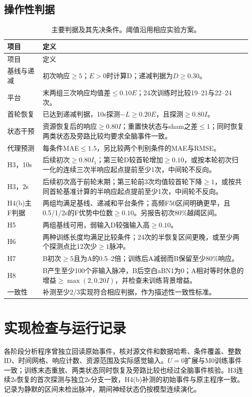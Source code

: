 \subsection{操作性判据}
\begingroup\small
\begin{longtable}{L{2.7cm}L{11.7cm}}
\caption{主要判据及其先决条件。阈值沿用相应实验方案。}\\
\toprule 项目 & 定义\\\midrule\endfirsthead
\toprule 项目 & 定义\\\midrule\endhead\bottomrule\endfoot
基线与递减 & 初次响应$\geq5$；$E>0$时计算D；递减判据为$D\geq0.30$。\\
平台 & 末两组三次响应均值差$\leq0.10E$；24次训练时比较19--21与22--24次。\\
首轮恢复 & 已达到递减判据，10s探测$-L\geq0.20E$，且探测$\geq0.80I$。\\
状态干预 & 资源恢复后的响应$\geq0.80I$；重置快状态与sham之差$\leq1$；同时恢复两类状态及旁路比较均要求全脑事件一致。\\
代理预测 & 每条件MAE$\leq1.5$，另比较两个判别条件的MAE与RMSE。\\
H3，10s & 后续初次$\geq0.80I_1$；第三轮D较首轮增加$\geq0.10$，或按本轮初次归一化的连续三次半响应起点提前至少1次，中间轮不反向。\\
H3，2s & 后续初次高于前轮末期；第三轮前3次均值较首轮下降$\geq1$，或按共同首轮基准计算的半响应起点提前至少1次，中间轮不反向。\\
H4(b)主F判据 & 两组均满足基线、递减和平台条件；高频F50区间明确更早，且0.5/1/2s的F优势中位数$\geq0.10$。另报告初次80\%越阈区间。\\
H5 & 两组基线可用，弱输入D较强输入高$\geq0.10$。\\
H6 & 两种训练长度均满足比较条件；24次的半恢复区间更晚，或至少两个探测点比12次少$\geq1$脉冲。\\
H7 & B初次$\geq5$且为A的0.5--2倍；训练后A减弱而B保留至少80\%响应。\\
H8 & B产生至少100个非输入脉冲，B后空白aBN1为0；A相对等时休息的增益$\geq\max(2,0.20I)$，并检查未训练背景增益。\\
一致性 & 补测至少2/3实现符合相应判据，作为描述性一致性标准。\\
\end{longtable}\endgroup

\section{实现检查与运行记录}
各阶段分析程序曾独立回读原始事件，核对源文件和数据哈希、条件覆盖、整数ID、时间网格、响应计数、资源范围及实际感觉输入。$U=0$扩展与M0训练事件一致；训练末态重放、两类状态同时恢复及旁路比较也经过全脑事件核验。H3连续2s恢复的首次探测与独立2s分支一致，H4(b)补测的初始事件与原主程序一致。记录为静默的区间未检出脉冲，期间神经状态仍按模型连续演化。

